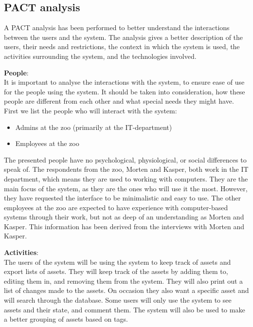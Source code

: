 \subsection{PACT analysis}\label{ssc:PACT}
A PACT analysis \cite[chap 2]{DEB} has been performed to better understand the interactions between the users and the system. The analysis gives a better description of the users, their needs and restrictions, the context in which the system is used, the activities surrounding the system, and the technologies involved.

\textbf{People}:\\
It is important to analyse the interactions with the system, to ensure ease of use for the people using the system. It should be taken into consideration, how these people are different from each other and what special needs they might have. First we list the people who will interact with the system:

\begin{itemize}
    \setlength\itemsep{0.05em}
    \item Admins at the zoo (primarily at the IT-department)
    \item Employees at the zoo
\end{itemize}

The presented people have no psychological, physiological, or social differences to speak of. The respondents from the zoo, Morten and Kasper, both work in the IT department, which means they are used to working with computers. They are the main focus of the system, as they are the ones who will use it the most. However, they have requested the interface to be minimalistic and easy to use. The other employees at the zoo are expected to have experience with computer-based systems through their work, but not as deep of an understanding as Morten and Kasper. This information has been derived from the interviews with Morten and Kasper.
\par

\textbf{Activities}: \\
The users of the system will be using the system to keep track of assets and export lists of assets. They will keep track of the assets by adding them to, editing them in, and removing them from the system. They will also print out a list of changes made to the assets. On occasion they also want a specific asset and will search through the database. Some users will only use the system to see assets and their state, and comment them. The system will also be used to make a better grouping of assets based on tags.
\par

